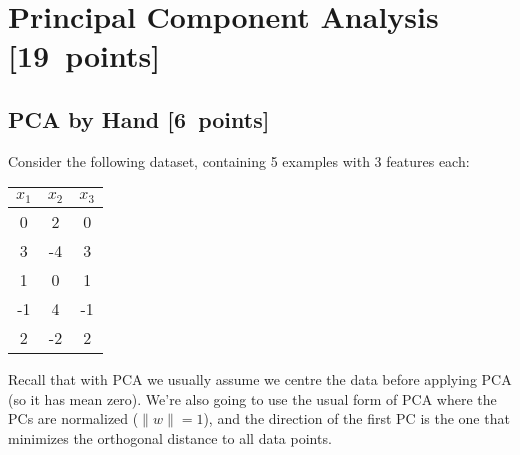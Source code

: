 \documentclass{article}
\newcommand\pts[1]{\textcolor{pointscolour}{[#1~points]}}
\newcommand{\norm}[1]{\lVert #1 \rVert}
\begin{document}
\clearpage
\section{Principal Component Analysis \pts{19}}
\subsection{PCA by Hand \pts{6}}

Consider the following dataset, containing 5 examples with 3 features each:
\begin{center}
  \begin{tabular}{ccc}
    $x_1$ & $x_2$ & $x_3$ \\
    \hline
     0 &  2 &  0 \\
     3 & -4 &  3 \\
     1 &  0 &  1 \\
    -1 &  4 & -1 \\
     2 & -2 &  2 \\
  \end{tabular}
\end{center}
Recall that with PCA we usually assume we centre the data before applying PCA (so it has mean zero).
We're also going to use the usual form of PCA where the PCs are normalized ($\norm{w} = 1$),
and the direction of the first PC is the one that minimizes the orthogonal distance to all data points.
\end{document}
